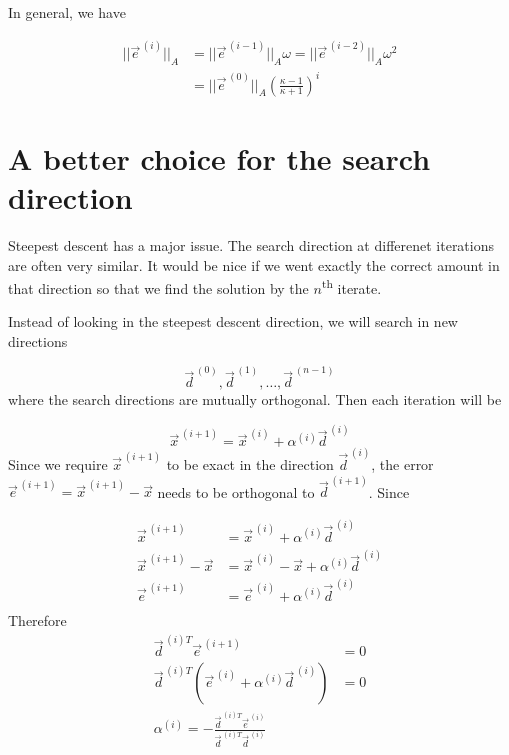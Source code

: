 
In general, we have

\begin{align*}
    || \vec{e}^{\,(i)} ||_A &= || \vec{e}^{\,(i-1)} ||_A\omega = || \vec{e}^{\,(i-2)} ||_A\omega^2\\
    &= || \vec{e}^{\,(0)} ||_A \left(\frac{\kappa-1}{\kappa+1}\right)^i
\end{align*}

\section*{A better choice for the search direction}

Steepest descent has a major issue. The search direction at differenet iterations are often very similar. It would be nice if we went exactly the correct amount in that direction so that we find the solution by the $n$\textsuperscript{th} iterate.


\begin{center}
    
\end{center}


Instead of looking in the steepest descent direction, we will search in new directions

\begin{equation*}
    \vec{d}^{\,(0)}, \vec{d}^{\,(1)}, \ldots, \vec{d}^{\,(n-1)}
\end{equation*}
where the search directions are mutually orthogonal. Then each iteration will be

\begin{equation*}
    \vec{x}^{\,(i+1)} = \vec{x}^{\,(i)}+ \alpha^{(i)}\vec{d}^{\,(i)}
\end{equation*}
Since we require $\vec{x}^{\,(i+1)}$ to be exact in the direction $\vec{d}^{\,(i)}$, the error $\vec{e}^{\,(i+1)} = \vec{x}^{\,(i+1)}-\vec{x}$ needs to be orthogonal to $\vec{d}^{\,(i+1)}$. Since

\begin{align*}
    \vec{x}^{\,(i+1)} &= \vec{x}^{\,(i)}+ \alpha^{(i)}\vec{d}^{\,(i)} \\
    \vec{x}^{\,(i+1)} -\vec{x} &= \vec{x}^{\,(i)}- \vec{x}+ \alpha^{(i)}\vec{d}^{\,(i)}  \\
    \vec{e}^{\,(i+1)} &= \vec{e}^{\,(i)}+ \alpha^{(i)}\vec{d}^{\,(i)} \\
\end{align*}
Therefore
\begin{align*}
    \vec{d}^{\,(i)T}\vec{e}^{\,(i+1)} &= 0 \\
    \vec{d}^{\,(i)T}(\vec{e}^{\,(i)}+ \alpha^{(i)}\vec{d}^{\,(i)}) &= 0 \\
    \alpha^{(i)} = - \frac{\vec{d}^{\,(i)T}\vec{e}^{\,(i)}}{\vec{d}^{\,(i)T}\vec{d}^{\,(i)}}
\end{align*}

